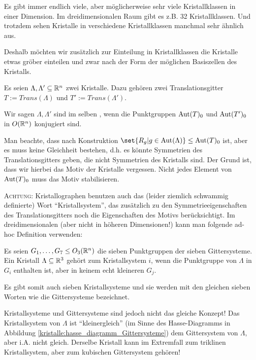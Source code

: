 \begin{remark}
Es gibt immer endlich viele, aber möglicherweise sehr viele Kristallklassen in einer Dimension. Im dreidimensionalen Raum gibt es z.B. 32 Kristallklassen. Und trotzdem sehen Kristalle in verschiedene Kristallklassen manchmal sehr ähnlich aus.

Deshalb möchten wir zusätzlich zur Einteilung in Kristallklassen die Kristalle etwas gröber einteilen und zwar nach der Form der möglichen Basiszellen des Kristalls.
\end{remark}

\begin{definition}[Gittersysteme]
Es seien $\Lambda, \Lambda' \subseteq\mathbb{R}^n$ zwei Kristalle. Dazu gehören zwei Translationsgitter $T:=Trans(\Lambda)$ und $T':=Trans(\Lambda')$.

Wir sagen $\Lambda,\Lambda'$ sind im selben , wenn die Punktgruppen $\operatorname{Aut}(T)_0$ und $\operatorname{Aut}(T')_0$ in $O(\mathbb{R}^n)$ konjugiert sind.
\end{definition}

\begin{remark}
Man beachte, dass nach Konstruktion $\set{R_g | g\in \Aut(\Lambda)} \leq \Aut(T)_0$ ist, aber es muss keine Gleichheit bestehen, d.h. es könnte Symmetrien des Translationsgitters geben, die nicht Symmetrien des Kristalls sind. Der Grund ist, dass wir hierbei das Motiv der Kristalle vergessen. Nicht jedes Element von $\operatorname{Aut}(T)_0$ muss das Motiv stabilisieren.
\end{remark}

\begin{remark}
\textsc{Achtung}: Kristallographen benutzen auch das (leider ziemlich schwammig definierte) Wort \enquote{Kristallsystem}, das zusätzlich zu den Symmetrieeigenschaften des Translationsgitters noch die Eigenschaften des Motivs berücksichtigt. Im dreidimensionalen (aber nicht in höheren Dimensionen!) kann man folgende ad-hoc Definition verwenden:

Es seien $G_1,\ldots,G_7\leq O_3(\mathbb{R}^n)$ die sieben Punktgruppen der sieben Gittersysteme. Ein Kristall $\Lambda\subseteq\mathbb{R}^3$ gehört zum Kristallsystem $i$, wenn die Punktgruppe von $\Lambda$ in $G_i$ enthalten ist, aber in keinem echt kleineren $G_j$.

\medbreak
Es gibt somit auch sieben Kristallsysteme und sie werden mit den gleichen sieben Worten wie die Gittersysteme bezeichnet.

\medbreak
Kristallsysteme und Gittersysteme sind jedoch nicht das gleiche Konzept! Das Kristallsystem von $\Lambda$ ist \enquote{kleinergleich} (im Sinne des Hasse-Diagramms in Abbildung \ref{kristalle:hasse_diagramm_Gittersysteme}) dem Gittersystem von $\Lambda$, aber i.A. nicht gleich. Derselbe Kristall kann im Extremfall zum triklinen Kristallsystem, aber zum kubischen Gittersystem gehören!
\end{remark}

